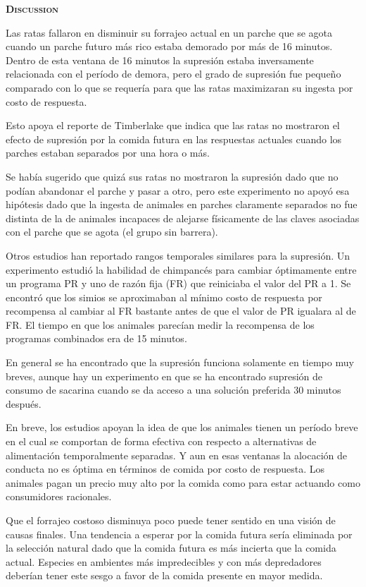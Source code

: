 \documentclass[a4paper,12pt]{article}
\begin{document}
{\scshape\bfseries Discussion}

Las ratas fallaron en disminuir su forrajeo actual en un parche que se agota cuando un parche futuro más rico estaba demorado por más de 16 minutos. Dentro de esta ventana de 16 minutos la supresión estaba inversamente relacionada con el período de demora, pero el grado de supresión fue pequeño comparado con lo que se requería para que las ratas maximizaran su ingesta por costo de respuesta.

Esto apoya el reporte de Timberlake que indica que las ratas no mostraron el efecto de supresión por la comida futura en las respuestas actuales cuando los parches estaban separados por una hora o más.

Se había sugerido que quizá sus ratas no mostraron la supresión dado que no podían abandonar el parche y pasar a otro, pero este experimento no apoyó esa hipótesis dado que la ingesta de animales en parches claramente separados no fue distinta de la de animales incapaces de alejarse físicamente de las claves asociadas con el parche que se agota (el grupo sin barrera).

Otros estudios han reportado rangos temporales similares para la supresión. Un experimento estudió la habilidad de chimpancés para cambiar óptimamente entre un programa PR y uno de razón fija (FR) que reiniciaba el valor del PR a 1. Se encontró que los simios se aproximaban al mínimo costo de respuesta por recompensa al cambiar al FR bastante antes de que el valor de PR igualara al de FR. El tiempo en que los animales parecían medir la recompensa de los programas combinados era de 15 minutos.

En general se ha encontrado que la supresión funciona solamente en tiempo muy breves, aunque hay un experimento en que se ha encontrado supresión de consumo de sacarina cuando se da acceso a una solución preferida 30 minutos después.

En breve, los estudios apoyan la idea de que los animales tienen un período breve en el cual se comportan de forma efectiva con respecto a alternativas de alimentación temporalmente separadas. Y aun en esas ventanas la alocación de conducta no es óptima en términos de comida por costo de respuesta. Los animales pagan un precio muy alto por la comida como para estar actuando como consumidores racionales.

Que el forrajeo costoso disminuya poco puede tener sentido en una visión de causas finales. Una tendencia a esperar por la comida futura sería eliminada por la selección natural dado que la comida futura es más incierta que la comida actual. Especies en ambientes más impredecibles y con más depredadores deberían tener este sesgo a favor de la comida presente en mayor medida.
\end{document}
